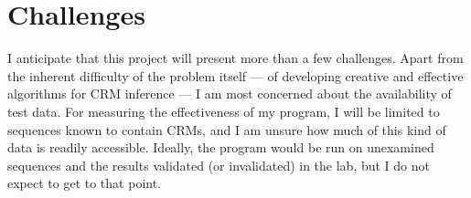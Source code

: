 \documentclass[11pt]{article}
\begin{document}
\section{Challenges}
I anticipate that this project will present more than a few challenges. Apart from the inherent difficulty of the problem itself --- of developing creative and effective algorithms for CRM inference --- I am most concerned about the availability of test data. For measuring the effectiveness of my program, I will be limited to sequences known to contain CRMs, and I am unsure how much of this kind of data is readily accessible. Ideally, the program would be run on unexamined sequences and the results validated (or invalidated) in the lab, but I do not expect to get to that point.
\end{document}
